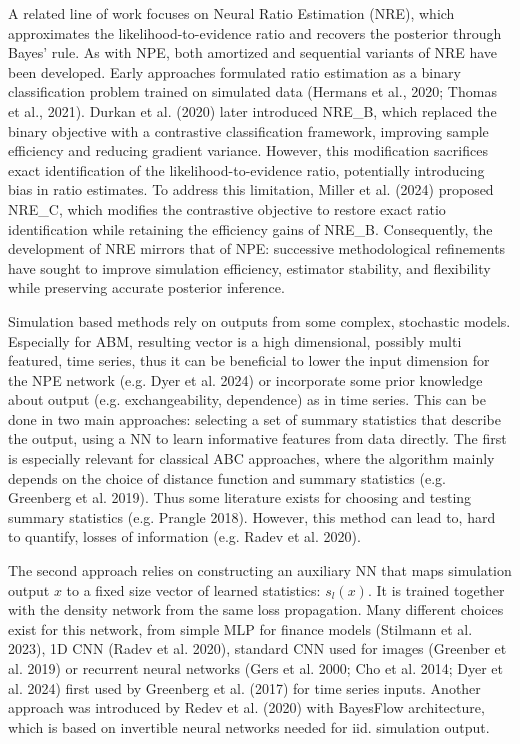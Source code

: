\documentclass[12pt]{article}
\begin{document}
A related line of work focuses on Neural Ratio Estimation (NRE), which approximates the likelihood-to-evidence ratio and recovers the posterior through Bayes’ rule. As with NPE, both amortized and sequential variants of NRE have been developed. Early approaches formulated ratio estimation as a binary classification problem trained on simulated data (Hermans et al., 2020; Thomas et al., 2021). Durkan et al. (2020) later introduced NRE\_B, which replaced the binary objective with a contrastive classification framework, improving sample efficiency and reducing gradient variance. However, this modification sacrifices exact identification of the likelihood-to-evidence ratio, potentially introducing bias in ratio estimates. To address this limitation, Miller et al. (2024) proposed NRE\_C, which modifies the contrastive objective to restore exact ratio identification while retaining the efficiency gains of NRE\_B. Consequently, the development of NRE mirrors that of NPE: successive methodological refinements have sought to improve simulation efficiency, estimator stability, and flexibility while preserving accurate posterior inference.  

Simulation based methods rely on outputs from some complex, stochastic models. Especially for ABM, resulting vector is a high dimensional, possibly multi featured, time series, thus it can be beneficial to lower the input dimension for the NPE network (e.g. Dyer et al. 2024) or incorporate some prior knowledge about output (e.g. exchangeability, dependence) as in time series. This can be done in two main approaches: selecting a set of summary statistics that describe the output, using a NN to learn informative features from data directly. The first is especially relevant for classical ABC approaches, where the algorithm mainly depends on the choice of distance function and summary statistics (e.g. Greenberg et al. 2019). Thus some literature exists for choosing and testing summary statistics (e.g. Prangle 2018). However, this method can lead to, hard to quantify, losses of information (e.g. Radev et al. 2020).

The second approach relies on constructing an auxiliary NN that maps simulation output $x$ to a fixed size vector of learned statistics: $s_l(x)$. It is trained together with the density network from the same loss propagation. Many different choices exist for this network, from simple MLP for finance models (Stilmann et al. 2023), 1D CNN (Radev et al. 2020), standard CNN used for images (Greenber et al. 2019) or recurrent neural networks (Gers et al. 2000; Cho et al. 2014; Dyer et al. 2024) first used by Greenberg et al. (2017) for time series inputs. Another approach was introduced by Redev et al. (2020) with BayesFlow architecture, which is based on invertible neural networks needed for iid. simulation output.
\end{document}
